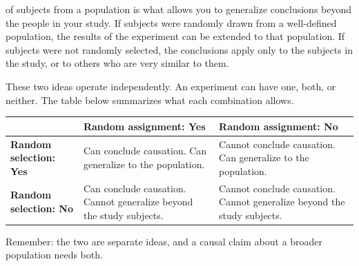  of subjects from a population is what allows you to 
generalize conclusions beyond the people in your study. If subjects were randomly drawn from a well-defined 
population, the results of the experiment can be extended to that population. If subjects were not randomly 
selected, the conclusions apply only to the subjects in the study, or to others who are very similar to them.

These two ideas operate independently. An experiment can have one, both, or neither. The table below summarizes what each combination allows.

\begin{center}
\begin{tabular}{|p{}|p{}|p{}|}
\hline
 & \textbf{Random assignment: Yes} & \textbf{Random assignment: No} \\
\hline
\textbf{Random selection: Yes} & Can conclude causation. Can generalize to the population. & Cannot conclude causation. Can generalize to the population. \\
\hline
\textbf{Random selection: No} & Can conclude causation. Cannot generalize beyond the study subjects. & Cannot conclude causation. Cannot generalize beyond the study subjects. \\
\hline
\end{tabular}
\end{center}

Remember: the two are separate ideas, and a causal claim about a broader population needs both.

